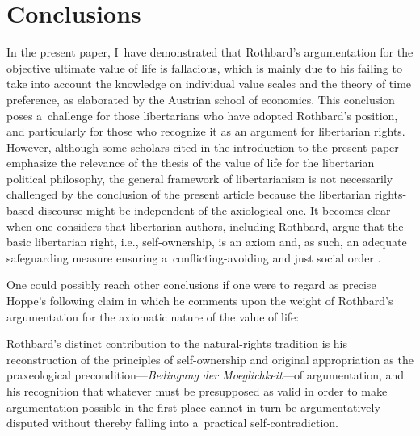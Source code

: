 \section{Conclusions}

In the present paper, I~have demonstrated that Rothbard's argumentation for the objective ultimate value of life is fallacious, which is mainly due to his failing to take into account the knowledge on individual value scales and the theory of time preference, as elaborated by the Austrian school of economics. This conclusion poses a~challenge for those libertarians who have adopted Rothbard's position, and particularly for those who recognize it as an argument for libertarian rights. However, although some scholars cited in the introduction to the present paper emphasize the relevance of the thesis of the value of life for the libertarian political philosophy, the general framework of libertarianism is not necessarily challenged by the conclusion of the present article because the libertarian rights-based discourse might be independent of the axiological one. It becomes clear when one considers that libertarian authors, including Rothbard, argue that the basic libertarian right, i.e., self-ownership, is an axiom and, as such, an adequate safeguarding measure ensuring a~conflicting-avoiding and just social order 
\parencites[see, e.g.,][p.736]{}[][]{}[][pp.184–186]{}[][p.60]{}[][pp.47–48]{}[see also liberal account of][pp.399–400]{}.%




One could possibly reach other conclusions if one were to regard as precise Hoppe's 
\parencite*[][p.xxxiv]{} %
 following claim in which he comments upon the weight of Rothbard's argumentation for the axiomatic nature of the value of life:



Rothbard's distinct contribution to the natural-rights tradition is his reconstruction of the principles of self-ownership and original appropriation as the praxeological precondition---\textit{Bedingung} \textit{der Moeglichkeit---}of argumentation, and his recognition that whatever must be presupposed as valid in order to make argumentation possible in the first place cannot in turn be argumentatively disputed without thereby falling into a~practical self-contradiction.



